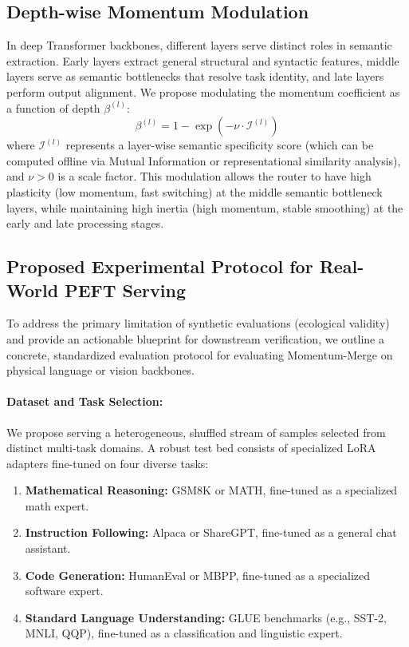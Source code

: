 \documentclass{article}
\theoremstyle{plain}
\theoremstyle{definition}
\theoremstyle{remark}
\begin{document}
\subsection{Depth-wise Momentum Modulation}
In deep Transformer backbones, different layers serve distinct roles in semantic extraction. Early layers extract general structural and syntactic features, middle layers serve as semantic bottlenecks that resolve task identity, and late layers perform output alignment. We propose modulating the momentum coefficient as a function of depth $\beta^{(l)}$:
\begin{equation}
    \beta^{(l)} = 1 - \exp\left(-\nu \cdot \mathcal{I}^{(l)}\right)
\end{equation}
where $\mathcal{I}^{(l)}$ represents a layer-wise semantic specificity score (which can be computed offline via Mutual Information or representational similarity analysis), and $\nu > 0$ is a scale factor. This modulation allows the router to have high plasticity (low momentum, fast switching) at the middle semantic bottleneck layers, while maintaining high inertia (high momentum, stable smoothing) at the early and late processing stages.

\subsection{Proposed Experimental Protocol for Real-World PEFT Serving}
To address the primary limitation of synthetic evaluations (ecological validity) and provide an actionable blueprint for downstream verification, we outline a concrete, standardized evaluation protocol for evaluating Momentum-Merge on physical language or vision backbones.

\paragraph{Dataset and Task Selection:} We propose serving a heterogeneous, shuffled stream of samples selected from distinct multi-task domains. A robust test bed consists of specialized LoRA adapters fine-tuned on four diverse tasks:
\begin{enumerate}
    \item \textbf{Mathematical Reasoning:} GSM8K or MATH, fine-tuned as a specialized math expert.
    \item \textbf{Instruction Following:} Alpaca or ShareGPT, fine-tuned as a general chat assistant.
    \item \textbf{Code Generation:} HumanEval or MBPP, fine-tuned as a specialized software expert.
    \item \textbf{Standard Language Understanding:} GLUE benchmarks (e.g., SST-2, MNLI, QQP), fine-tuned as a classification and linguistic expert.
\end{enumerate}
\end{document}
